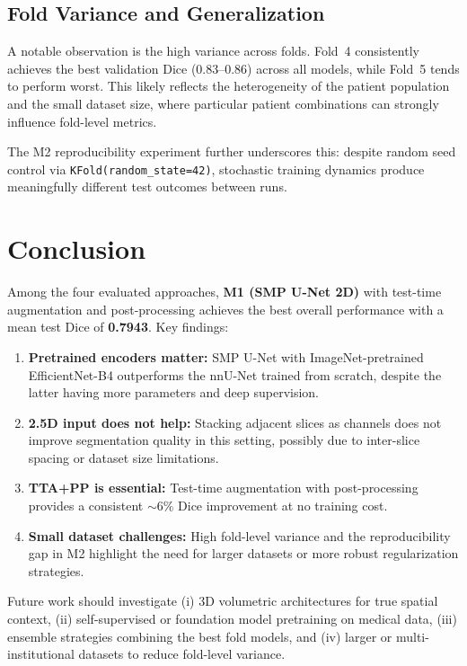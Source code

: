 \documentclass[11pt,a4paper]{article}
\begin{document}
\subsection{Fold Variance and Generalization}

A notable observation is the high variance across folds. Fold~4 consistently achieves the best validation Dice (0.83--0.86) across all models, while Fold~5 tends to perform worst. This likely reflects the heterogeneity of the patient population and the small dataset size, where particular patient combinations can strongly influence fold-level metrics.

The M2 reproducibility experiment further underscores this: despite random seed control via \texttt{KFold(random\_state=42)}, stochastic training dynamics produce meaningfully different test outcomes between runs.

\section{Conclusion}

Among the four evaluated approaches, \textbf{M1 (SMP U-Net 2D)} with test-time augmentation and post-processing achieves the best overall performance with a mean test Dice of \textbf{0.7943}. Key findings:

\begin{enumerate}
    \item \textbf{Pretrained encoders matter:} SMP U-Net with ImageNet-pretrained EfficientNet-B4 outperforms the nnU-Net trained from scratch, despite the latter having more parameters and deep supervision.
    \item \textbf{2.5D input does not help:} Stacking adjacent slices as channels does not improve segmentation quality in this setting, possibly due to inter-slice spacing or dataset size limitations.
    \item \textbf{TTA+PP is essential:} Test-time augmentation with post-processing provides a consistent $\sim$6\% Dice improvement at no training cost.
    \item \textbf{Small dataset challenges:} High fold-level variance and the reproducibility gap in M2 highlight the need for larger datasets or more robust regularization strategies.
\end{enumerate}

Future work should investigate (i) 3D volumetric architectures for true spatial context, (ii) self-supervised or foundation model pretraining on medical data, (iii) ensemble strategies combining the best fold models, and (iv) larger or multi-institutional datasets to reduce fold-level variance.
\end{document}
